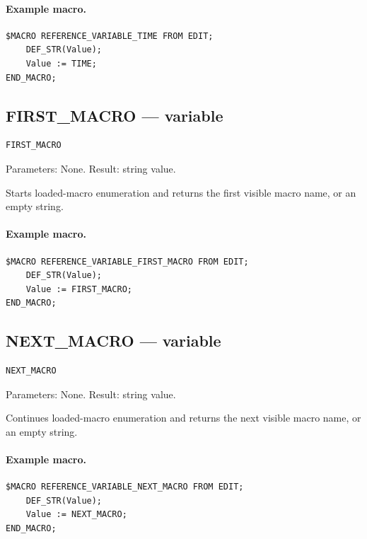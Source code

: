 \documentclass[a4paper,10pt,twoside,openany]{book}
\begin{document}
\paragraph{Example macro.}
\begin{verbatim}
$MACRO REFERENCE_VARIABLE_TIME FROM EDIT;
    DEF_STR(Value);
    Value := TIME;
END_MACRO;
\end{verbatim}

\label{prim:variable-first-macro}
\subsection*{FIRST\_MACRO --- variable}
\begin{verbatim}
FIRST_MACRO
\end{verbatim}
Parameters: None. Result: string value.

Starts loaded-macro enumeration and returns the first visible macro name, or an empty string.

\paragraph{Example macro.}
\begin{verbatim}
$MACRO REFERENCE_VARIABLE_FIRST_MACRO FROM EDIT;
    DEF_STR(Value);
    Value := FIRST_MACRO;
END_MACRO;
\end{verbatim}

\label{prim:variable-next-macro}
\subsection*{NEXT\_MACRO --- variable}
\begin{verbatim}
NEXT_MACRO
\end{verbatim}
Parameters: None. Result: string value.

Continues loaded-macro enumeration and returns the next visible macro name, or an empty string.

\paragraph{Example macro.}
\begin{verbatim}
$MACRO REFERENCE_VARIABLE_NEXT_MACRO FROM EDIT;
    DEF_STR(Value);
    Value := NEXT_MACRO;
END_MACRO;
\end{verbatim}

\label{prim:variable-last-file-name}
\end{document}
